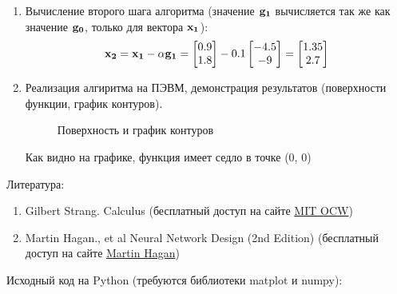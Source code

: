 \documentclass[a4paper]{report}
\begin{document}
\begin{enumerate}
    \item Вычисление второго шага алгоритма (значение ${\bf g_1}$ вычисляется так же как значение ${\bf g_0}$, только для вектора ${\bf x_1}$):
        \begin{eqnarray}
            {\bf x_2} = {\bf x_1} - \alpha {\bf g_1} = 
                \left[
                \begin{matrix}
                    0.9 \\
                    1.8
                \end{matrix}
                \right]
                - 0.1
                \left[
                \begin{matrix}
                    -4.5 \\
                    -9
                \end{matrix}
                \right]
                =
                \left[
                \begin{matrix}
                    1.35 \\
                    2.7 
                \end{matrix}
                \right]
        \end{eqnarray}
    
    \item Реализация алгиритма на ПЭВМ, демонстрация результатов (поверхности функции, график контуров).
    \begin{figure}[h]
        \center{}
        \caption{Поверхность и график контуров} 
        \label{pic:graph}
    \end{figure}

    Как видно на графике, функция имеет седло в точке (0, 0)
\end{enumerate}

Литература:
\begin{enumerate}
    \item Gilbert Strang. Calculus (бесплатный доступ на сайте \href{http://ocw.mit.edu/ans7870/resources/Strang/Edited/Calculus/Calculus.pdf}{MIT OCW})
    \item Martin Hagan., et al Neural Network Design (2nd Edition) (бесплатный доступ на сайте \href{http://hagan.okstate.edu/nnd.html}{Martin Hagan})
\end{enumerate}

Исходный код на Python (требуются библиотеки matplot и numpy):

\end{document}
